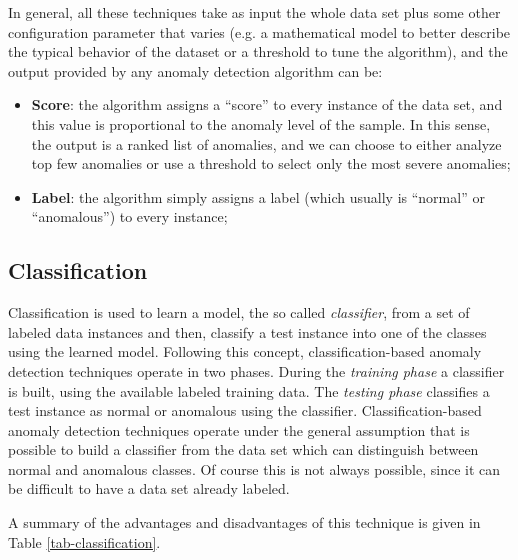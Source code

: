 \documentclass[12pt,a4paper,cucitura]{toptesi}
\begin{document}
In general, all these techniques take as input the whole data set plus some other configuration parameter that varies (e.g. a mathematical model to better describe the typical behavior of the dataset or a threshold to tune the algorithm), and the output provided by any anomaly detection algorithm can be:

\begin{itemize}
\item \textbf{Score}: the algorithm assigns a ``score'' to every instance of the data set, and this value is proportional to the anomaly level of the sample.
In this sense, the output is a ranked list of anomalies, and we can choose to either analyze top few anomalies or use a threshold to select only the most severe anomalies;
\item \textbf{Label}: the algorithm simply assigns a label (which usually is ``normal'' or ``anomalous'') to every instance;
\end{itemize}

\subsection{Classification}
Classification is used to learn a model, the so called \emph{classifier}, from a set of labeled data instances and then, classify a test instance into
one of the classes using the learned model.
Following this concept, classification-based anomaly detection techniques operate in two phases.
During the \emph{training phase} a classifier is built, using the available labeled training data.
The \emph{testing phase} classifies a test instance as normal or anomalous using the classifier.
Classification-based anomaly detection techniques operate under the general assumption that is possible to build a classifier from the data set which can distinguish between normal and anomalous classes. 
Of course this is not always possible, since it can be difficult to have a data set already labeled.

A summary of the advantages and disadvantages of this technique is given in Table \ref{tab-classification}.
\end{document}
